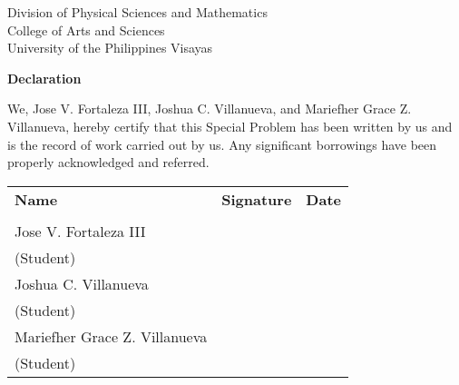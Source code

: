 \begin{center}
	Division of Physical Sciences and Mathematics\\
	College of Arts and Sciences\\
	University of the Philippines Visayas 
	
		\textbf{Declaration}
		\end{center}

We,  Jose V. Fortaleza III, Joshua C. Villanueva, and Mariefher Grace Z. Villanueva, hereby certify that this Special Problem has been written by us  and is the record of work carried out by us. Any significant borrowings have been properly acknowledged and referred.

	\begin{tabular}{lll}
	\bfseries Name  & \bfseries Signature & \bfseries Date\\ \\
	Jose V. Fortaleza III &\signaturerule  & \signaturerule\\ 
	\multicolumn{1}{l}{(Student)} \\ 
	Joshua C. Villanueva &\signaturerule  & \signaturerule\\ 
	\multicolumn{1}{l}{(Student)} \\
	Mariefher Grace Z. Villanueva &\signaturerule  & \signaturerule\\ 
\multicolumn{1}{l}{(Student)} \\

\end{tabular}




